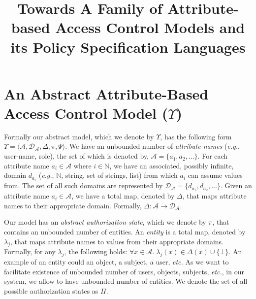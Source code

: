 \documentclass{sig-alternate}
\title{Towards A Family of Attribute-based Access Control Models and its Policy Specification Languages}
\author{}
\date{}
\newcommand{\ie}{\textit{i.e.}\xspace}
\newcommand{\eg}{\textit{e.g.}\xspace}
\newcommand{\etc}{\textit{etc.}\xspace}
\newcommand{\state}{\ensuremath{\pi}\xspace}
\newcommand{\stateset}{\ensuremath{\Pi}\xspace}
\newcommand{\policyfunc}{\ensuremath{\Psi}\xspace}
\newcommand{\cD}{\ensuremath{\mathcal{D}}\xspace}
\newcommand{\cA}{\ensuremath{\mathcal{A}}\xspace}
\newcommand{\funcname}[1]{\textbf{\texttt{#1}}}
\newcommand{\dom}{\ensuremath{\Delta}\xspace} %
\newcommand{\domop}{\funcname{opDom}\xspace} %
\newcommand{\OP}{\ensuremath{\mathcal{OP}}\xspace}
\newcommand{\arity}{\ensuremath{\iota}\xspace}
\newcommand{\entity}{\ensuremath{\lambda}\xspace}
\newcommand{\op}{\ensuremath{\mu}\xspace}
\newcommand{\abac}{\ensuremath{\Upsilon}\xspace}
\begin{document}
\maketitle

\begin{abstract}

\end{abstract}



\section{An Abstract Attribute-Based Access Control Model (\abac)}
\label{sec:model}
Formally our abstract model, which we denote by \abac, has the following form 
$\abac=\langle\cA, \cD_{\cA}, \dom,  \state, \policyfunc\rangle$. 
We have an unbounded number of \emph{attribute names} (\eg, user-name, role), the set of which is denoted by, $\cA=\{a_1, a_2,\ldots\}$.  
For each attribute name $a_i\in\cA$ where $i\in\mathbb{N}$, we have an associated, possibly infinite, domain $d_{a_i}$ (\eg, $\mathbb{N}$, 
string, set of strings, list) from which $a_i$ can assume values from. 
The set of all such domains are represented by $\cD_{\cA}=\{d_{a_1}, d_{a_2}, \ldots\}$.  Given an attribute 
name $a_i \in \cA$, we have a total map, denoted by \dom, that maps attribute names to their 
appropriate domain. Formally, $\dom: \cA \rightarrow \cD_{\cA}$. 


Our model has an \emph{abstract authorization state}, which we denote by \state, that contains an unbounded number of entities. 
An \emph{entity} is a total map, denoted by $\entity_j$, that maps attribute names to values from their appropriate domains.
Formally, for any $\entity_j$, the following holds: $\forall x \in \cA.\; \entity_j(x) \in \dom(x) \cup \{\bot\}$. 
An example of an entity could an object, a subject, a user, \etc As we want to facilitate existence of unbounded number 
of users, objects, subjects, \etc, in our system, we allow to have unbounded number of entities. 
We denote the set of all possible authorization states as \stateset. 
\end{document}
